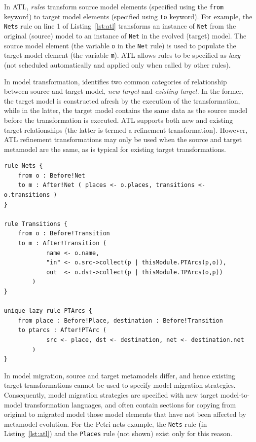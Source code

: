 In ATL, \emph{rule}s transform source model elements (specified using the \texttt{fr\-om} keyword) to target model elements (specified using \texttt{to} keyword). For example, the \texttt{Nets} rule on line 1 of Listing~\ref{lst:atl} transforms an instance of \texttt{Net} from the original (source) model to an instance of \texttt{Net} in the evolved (target) model. The source model element (the variable \texttt{o} in the \texttt{Net} rule) is used to populate the target model element (the variable \texttt{m}). ATL allows rules to be specified as \emph{lazy} (not scheduled automatically and applied only when called by other rules).

In model transformation, \cite{czarnecki06survey} identifies two common categories of relationship between source and target model, \emph{new target} and \emph{existing target}. In the former, the target model is constructed afresh by the execution of the transformation, while in the latter, the target model contains the same data as the source model before the transformation is executed. ATL supports both new and existing target relationships (the latter is termed a refinement transformation). However, ATL refinement transformations may only be used when the source and target metamodel are the same, as is typical for existing target transformations. 

\begin{lstlisting}[caption=Fragment of the Petri nets model migration in ATL, label=lst:atl, language=ATL]
rule Nets {
	from o : Before!Net
	to m : After!Net ( places <- o.places, transitions <- o.transitions )
}

rule Transitions {
	from o : Before!Transition
	to m : After!Transition (
			name <- o.name,
			"in" <- o.src->collect(p | thisModule.PTArcs(p,o)),
			out  <- o.dst->collect(p | thisModule.TPArcs(o,p))
		)
}

unique lazy rule PTArcs {
	from place : Before!Place, destination : Before!Transition
	to ptarcs : After!PTArc (
			src <- place, dst <- destination, net <- destination.net
		)
}
\end{lstlisting}

In model migration, source and target metamodels differ, and hence existing target transformations cannot be used to specify model migration strategies. Consequently, model migration strategies are specified with new target model-to-model transformation languages, and often contain sections for copying from original to migrated model those model elements that have not been affected by metamodel evolution. For the Petri nets example, the \texttt{Nets} rule (in Listing~\ref{lst:atl}) and the \texttt{Places} rule (not shown) exist only for this reason.

